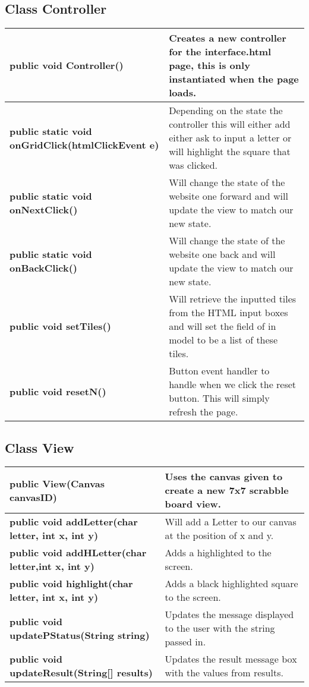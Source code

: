 \documentclass[11pt]{article}
\begin{document}
\subsection{Class Controller}
\begin{tabular}{|p{}|p{}|}
\hline
%
\textbf{public void Controller()} & Creates a new controller for the interface.html page, this is only instantiated when the page loads.\\
%
\hline
\textbf{public static void onGridClick(htmlClickEvent e)} & Depending on the state the controller this will either add either ask to input a letter or will highlight the square that was clicked.\\
%
\hline
\textbf{public static void onNextClick()} & Will change the state of the website one forward and will update the view to match our new state.\\
%
\hline
\textbf{public static void onBackClick()} & Will change the state of the website one back and will update the view to match our new state.\\
%
\hline
\textbf{public void setTiles()} & Will retrieve the inputted tiles from the HTML input boxes and will set the field of in model to be a list of these tiles.\\
%
\hline
\textbf{public void resetN()} & Button event handler to handle when we click the reset button. This will simply refresh the page.\\
%
\hline
\end{tabular}

\subsection{Class View}
\begin{tabular}{|p{}|p{}|}
\hline
\textbf{public View(Canvas  canvasID)} & Uses the canvas given to create a new 7x7 scrabble board view.\\
%
\hline
\textbf{public void addLetter(char letter, int x, int y)} & Will add a Letter to our canvas at the position of x and y.\\
%
\hline
\textbf{public void addHLetter(char letter,int x, int y)} & Adds a highlighted to the screen.\\
%
\hline
\textbf{public void highlight(char letter, int x, int y)} & Adds a black highlighted square to the screen.\\
%
\hline
\textbf{public void updatePStatus(String string)} & Updates the message displayed to the user with the string passed in.\\
%
\hline
\textbf{public void updateResult(String[] results)} & Updates the result message box with the values from results.\\
\hline
\end{tabular}
\end{document}
